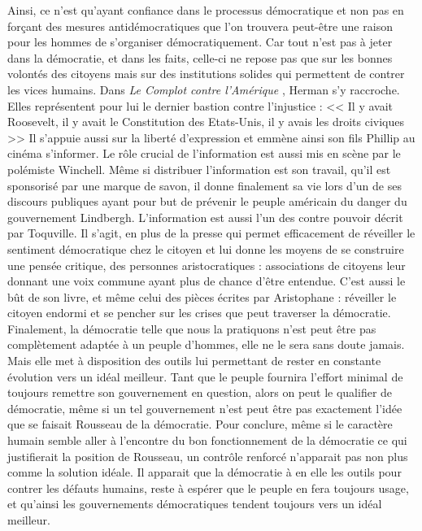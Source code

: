 \documentclass[a4paper]{article}
\newcommand{\cca}{\textit{Le Complot contre l'Amérique }}
\begin{document}
	Ainsi, ce n'est qu'ayant confiance dans le processus démocratique et non pas en forçant des mesures antidémocratiques que l'on trouvera peut-être une raison pour les hommes de s'organiser démocratiquement. Car tout n'est pas à jeter dans la démocratie, et dans les faits, celle-ci ne repose pas que sur les bonnes volontés des citoyens mais sur des institutions solides qui permettent de contrer les vices humains. Dans \cca, Herman s'y raccroche. Elles représentent pour lui le dernier bastion contre l'injustice : << Il y avait Roosevelt, il y avait le Constitution des Etats-Unis, il y avais les droits civiques >> Il s'appuie aussi sur la liberté d'expression et emmène ainsi son fils Phillip au cinéma s'informer. Le rôle crucial de l'information est aussi mis en scène par le polémiste Winchell. Même si distribuer l'information est son travail, qu'il est sponsorisé par une marque de savon, il donne finalement sa vie lors d'un de ses discours publiques ayant pour but de prévenir le peuple américain du danger du gouvernement Lindbergh. L'information est aussi l'un des contre pouvoir décrit par Toquville. Il s'agit, en plus de la presse qui permet efficacement de réveiller le sentiment démocratique chez le citoyen et lui donne les moyens de se construire une pensée critique, des personnes aristocratiques : associations de citoyens leur donnant une voix commune ayant plus de chance d'être entendue. C'est aussi le bût de son livre, et même celui des pièces écrites par Aristophane : réveiller le citoyen endormi et se pencher sur les crises que peut traverser la démocratie. \\
	

	Finalement, la démocratie telle que nous la pratiquons n'est peut être pas complètement adaptée à un peuple d'hommes, elle ne le sera sans doute jamais. Mais elle met à disposition des outils lui permettant de rester en constante évolution vers un idéal meilleur. Tant que le peuple fournira l'effort minimal de toujours remettre son gouvernement en question, alors on peut le qualifier de démocratie, même si un tel gouvernement n'est peut être pas exactement l'idée que se faisait Rousseau de la démocratie. Pour conclure, même si le caractère humain semble aller à l'encontre du bon fonctionnement de la démocratie ce qui justifierait la position de Rousseau, un contrôle renforcé n'apparait pas non plus comme la solution idéale. Il apparait que la démocratie à en elle les outils pour contrer les défauts humains, reste à espérer que le peuple en fera toujours usage, et qu'ainsi les gouvernements démocratiques tendent toujours vers un idéal meilleur. 
\end{document}

